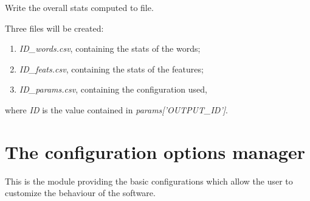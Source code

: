 \documentclass[letterpaper,10pt,english]{sphinxmanual}
\begin{document}
\begin{fulllineitems}

\begin{fulllineitems}
\label{index:naive_bayes.Bayes.write_bayes}
Write the overall stats computed to file.

Three files will be created:
\begin{enumerate}
\item {} 
\emph{ID\_words.csv}, containing the stats of the words;

\item {} 
\emph{ID\_feats.csv}, containing the stats of the features;

\item {} 
\emph{ID\_params.csv}, containing the configuration used,

\end{enumerate}

where \emph{ID} is the value contained in \emph{params{[}'OUTPUT\_ID'{]}}.

\end{fulllineitems}


\end{fulllineitems}



\section{The configuration options manager}
\label{index:the-configuration-options-manager}
This is the module providing the basic configurations which allow the user to customize the behaviour of the software.
\label{index:module-config}
\end{document}
